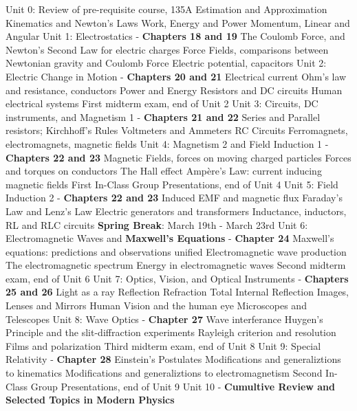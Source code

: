 \documentclass[10pt]{article}
\begin{document}
\begin{outline}[enumerate]
\1 Unit 0: Review of pre-requisite course, 135A
\2 Estimation and Approximation
\2 Kinematics and Newton's Laws
\2 Work, Energy and Power
\2 Momentum, Linear and Angular
\1 Unit 1: Electrostatics - \textbf{Chapters 18 and 19}
\2 The Coulomb Force, and Newton's Second Law for electric charges
\2 Force Fields, comparisons between Newtonian gravity and Coulomb Force
\2 Electric potential, capacitors
\1 Unit 2: Electric Change in Motion - \textbf{Chapters 20 and 21}
\2 Electrical current
\2 Ohm's law and resistance, conductors
\2 Power and Energy
\2 Resistors and DC circuits
\2 Human electrical systems
\1 First midterm exam, end of Unit 2
\1 Unit 3: Circuits, DC instruments, and Magnetism 1 - \textbf{Chapters 21 and 22}
\2 Series and Parallel resistors; Kirchhoff's Rules
\2 Voltmeters and Ammeters
\2 RC Circuits
\2 Ferromagnets, electromagnets, magnetic fields
\1 Unit 4: Magnetism 2 and Field Induction 1 - \textbf{Chapters 22 and 23}
\2 Magnetic Fields, forces on moving charged particles
\2 Forces and torques on conductors
\2 The Hall effect
\2 Amp\`{e}re's Law: current inducing magnetic fields
\1 First In-Class Group Presentations, end of Unit 4
\1 Unit 5: Field Induction 2 - \textbf{Chapters 22 and 23}
\2 Induced EMF and magnetic flux
\2 Faraday's Law and Lenz's Law
\2 Electric generators and transformers
\2 Inductance, inductors, RL and RLC circuits
\1 \textbf{Spring Break}: March 19th - March 23rd
\1 Unit 6: Electromagnetic Waves and \textbf{Maxwell's Equations} - \textbf{Chapter 24}
\2 Maxwell's equations: predictions and observations unified
\2 Electromagnetic wave production
\2 The electromagnetic spectrum
\2 Energy in electromagnetic waves
\1 Second midterm exam, end of Unit 6
\1 Unit 7: Optics, Vision, and Optical Instruments - \textbf{Chapters 25 and 26}
\2 Light as a ray
\3 Reflection
\3 Refraction
\3 Total Internal Reflection
\2 Images, Lenses and Mirrors
\2 Human Vision and the human eye
\2 Microscopes and Telescopes
\1 Unit 8: Wave Optics - \textbf{Chapter 27}
\2 Wave interferance
\2 Huygen's Principle and the slit-diffraction experiments
\2 Rayleigh criterion and resolution
\2 Films and polarization
\1 Third midterm exam, end of Unit 8
\1 Unit 9: Special Relativity - \textbf{Chapter 28}
\2 Einstein's Postulates
\2 Modifications and generaliztions to kinematics
\2 Modifications and generaliztions to electromagnetism
\1 Second In-Class Group Presentations, end of Unit 9
\1 Unit 10 - \textbf{Cumultive Review and Selected Topics in Modern Physics}
\end{outline}
\end{document}
